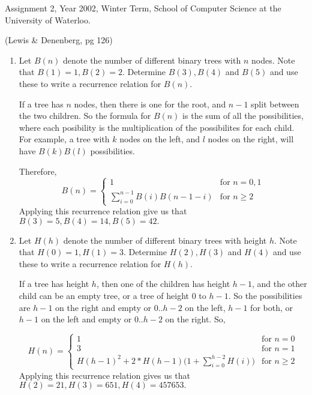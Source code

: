 \begin{usage}
Assignment 2, Year 2002, Winter Term, School of Computer Science at the University of Waterloo.
\end{usage}
\begin{authorship}
  (Lewis \& Denenberg, pg 126)
\end{authorship}

\begin{enumerate}
\item  Let $B(n)$ denote the number of different binary trees
with $n$ nodes.  Note that $B(1)=1, B(2)=2$.  Determine
$B(3), B(4)$ and $B(5)$ and use these to write a recurrence
relation for $B(n)$.


\begin{solution}
  If a tree has $n$ nodes, then there is one for the root, and $n-1$
  split between the two children. So the formula for $B(n)$ is the sum
  of all the possibilities, where each posibility is the
  multiplication of the possibilites for each child. For example, a
  tree with $k$ nodes on the left, and $l$ nodes on the right, will
  have $B(k)B(l)$ possibilities.

Therefore,
\begin{displaymath}
B(n) = \left\{
\begin{array}{ll}
1 & \textrm{for $n=0,1$} \\
\sum_{i=0}^{n-1} B(i)B(n-1-i) & \textrm{for $n \geq 2$}
\end{array}
\right.
\end{displaymath}
Applying this recurrence relation give us that $B(3)=5, B(4)=14, B(5)=42.$

\end{solution}

\item Let $H(h)$ denote the number of different binary trees
with height $h$.  Note that $H(0)=1, H(1)=3$.  Determine
$H(2), H(3)$ and $H(4)$ and use these to write a recurrence
relation for $H(h)$.

\begin{solution}
  If a tree has height $h$, then one of the children has height $h-1$,
  and the other child can be an empty tree, or a tree of height $0$ to
  $h-1$. So the possibilities are $h-1$ on the right and empty or
  $0..h-2$ on the left, $h-1$ for both, or $h-1$ on the left and empty
  or $0..h-2$ on the right. So,

\begin{displaymath}
H(n) = \left\{
\begin{array}{ll}
1 & \textrm{for $n=0$} \\
3 & \textrm{for $n=1$} \\
H(h-1)^2 + 2*H(h-1) \Big( 1 + \sum_{i=0}^{h-2} H(i) \Big) & \textrm{for $n \geq 2$}
\end{array} \right.
\end{displaymath}
Applying this recurrence relation gives us that $H(2)=21, H(3)=651, H(4)=457653.$

\end{solution}
\end{enumerate}

